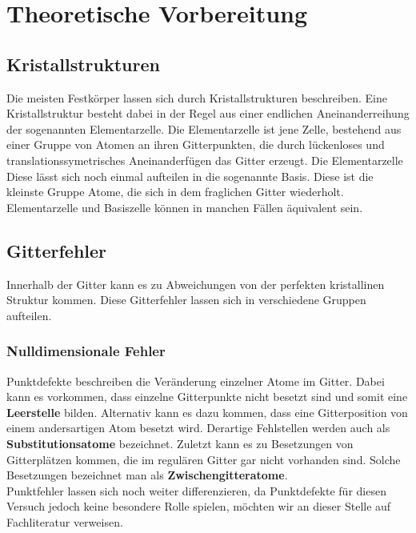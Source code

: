 ﻿\section{Theoretische Vorbereitung}
    \subsection{Kristallstrukturen}
        Die meisten Festkörper lassen sich durch Kristallstrukturen beschreiben. Eine Kristallstruktur besteht
        dabei in der Regel aus einer endlichen Aneinanderreihung der sogenannten Elementarzelle. Die Elementarzelle ist
        jene Zelle, bestehend aus einer Gruppe von Atomen an ihren Gitterpunkten, die durch lückenloses und translationssymetrisches Aneinanderfügen das Gitter erzeugt. Die Elementarzelle
        Diese lässt sich noch einmal aufteilen in die sogenannte Basis. Diese ist die kleinste Gruppe Atome, die
        sich in dem fraglichen Gitter wiederholt. Elementarzelle und Basiszelle können in manchen Fällen äquivalent sein.
    \subsection{Gitterfehler}
        Innerhalb der Gitter kann es zu Abweichungen von der perfekten kristallinen Struktur kommen. Diese Gitterfehler lassen
        sich in verschiedene Gruppen aufteilen.
        \subsubsection*{Nulldimensionale Fehler}
            Punktdefekte beschreiben die Veränderung einzelner Atome im Gitter. Dabei kann es vorkommen, dass 
            einzelne Gitterpunkte nicht besetzt sind und somit eine \textbf{Leerstelle} bilden.
            Alternativ kann es dazu kommen, dass eine Gitterposition von einem andersartigen Atom besetzt wird.
            Derartige Fehlstellen werden auch als \textbf{Substitutionsatome} bezeichnet.
            Zuletzt kann es zu Besetzungen von Gitterplätzen kommen, die im regulären Gitter gar nicht vorhanden sind.
            Solche Besetzungen bezeichnet man als \textbf{Zwischengitteratome}.\\
            Punktfehler lassen sich noch weiter differenzieren, da Punktdefekte für diesen Versuch jedoch keine besondere
            Rolle spielen, möchten wir an dieser Stelle auf Fachliteratur verweisen.
